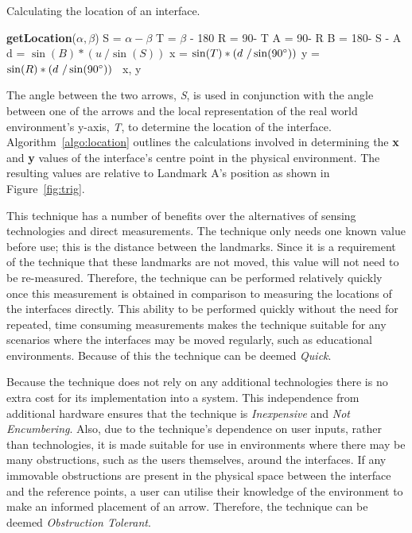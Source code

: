 \documentclass{bmcart}
\newcommand{\INDSTATE}[1][1]{\STATE\hspace{#1\algorithmicindent}}
\begin{document}
\begin{algorithm}[h]
\caption{Calculating the location of an interface.}
\label{algo:location}
\begin{algorithmic}
\STATE \textbf{getLocation}(${\alpha}, {\beta}$)
\INDSTATE[2] S = $\alpha - \beta$
\INDSTATE[2] T = $\beta$ - 180\degree
\INDSTATE[2] R = 90\degree - T
\INDSTATE[2] A = 90\degree - R
\INDSTATE[2] B = 180\degree - S - A
\INDSTATE[2] d = $\sin (B) * (u\ / \sin (S))$
\INDSTATE[2] x = $\sin (T) * (d\ / \sin (90\degree))$
\INDSTATE[2] y = $\sin (R) * (d\ / \sin (90\degree))$
\ x, y
\end{algorithmic}
\end{algorithm}

The angle between the two arrows, {\emph{S}}, is used in conjunction with the angle between one of the arrows and the local representation of the real world environment's y-axis, {\emph{T}}, to determine the location of the interface.
Algorithm~\ref{algo:location} outlines the calculations involved in determining the \textbf{x} and \textbf{y} values of the interface's centre point in the physical environment.
The resulting values are relative to Landmark A's position as shown in Figure~\ref{fig:trig}.

This technique has a number of benefits over the alternatives of sensing technologies and direct measurements.
The technique only needs one known value before use; this is the distance between the landmarks.
Since it is a requirement of the technique that these landmarks are not moved, this value will not need to be re-measured.
Therefore, the technique can be performed relatively quickly once this measurement is obtained in comparison to measuring the locations of the interfaces directly.
This ability to be performed quickly without the need for repeated, time consuming measurements makes the technique suitable for any scenarios where the interfaces may be moved regularly, such as educational environments.
Because of this the technique can be deemed {\emph{Quick}}.

Because the technique does not rely on any additional technologies there is no extra cost for its implementation into a system.
This independence from additional hardware ensures that the technique is {\emph{Inexpensive}} and {\emph{Not Encumbering}}.
Also, due to the technique's dependence on user inputs, rather than technologies, it is made suitable for use in environments where there may be many obstructions, such as the users themselves, around the interfaces.
If any immovable obstructions are present in the physical space between the interface and the reference points, a user can utilise their knowledge of the environment to make an informed placement of an arrow.
Therefore, the technique can be deemed {\emph{Obstruction Tolerant}}.
\end{document}

